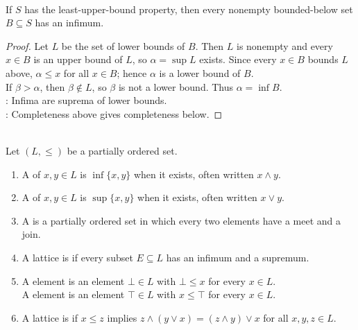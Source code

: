 \begin{theorem} \label{thm:lub-property-gives-glb-property} \\
If $S$ has the least-upper-bound property, then every nonempty bounded-below set $B\subseteq S$ has an infimum.
\begin{proof}
Let $L$ be the set of lower bounds of $B$. Then $L$ is nonempty and every $x\in B$ is an upper bound of $L$, so $\alpha=\sup L$ exists. Since every $x\in B$ bounds $L$ above, $\alpha\leq x$ for all $x\in B$; hence $\alpha$ is a lower bound of $B$.\\
If $\beta>\alpha$, then $\beta\notin L$, so $\beta$ is not a lower bound. Thus $\alpha=\inf B$.\\
: Infima are suprema of lower bounds.\\
: Completeness above gives completeness below.
\end{proof}
\end{theorem}

\begin{definition} \label{def:lattice-vocabulary} \\
Let $(L,\leq)$ be a partially ordered set.
\begin{enumerate}[label=(\roman*)]
\setlength{\itemsep}{0pt}
\item A  of $x,y\in L$ is $\inf\{x,y\}$ when it exists, often written $x\wedge y$.
\item A  of $x,y\in L$ is $\sup\{x,y\}$ when it exists, often written $x\vee y$.
\item A  is a partially ordered set in which every two elements have a meet and a join.
\item A lattice is  if every subset $E\subseteq L$ has an infimum and a supremum.
\item A  element is an element $\bot\in L$ with $\bot\leq x$ for every $x\in L$.\\
A  element is an element $\top\in L$ with $x\leq\top$ for every $x\in L$.
\item A lattice is  if $x\leq z$ implies $z\wedge(y\vee x)=(z\wedge y)\vee x$ for all $x,y,z\in L$.
\end{enumerate}
\end{definition}
